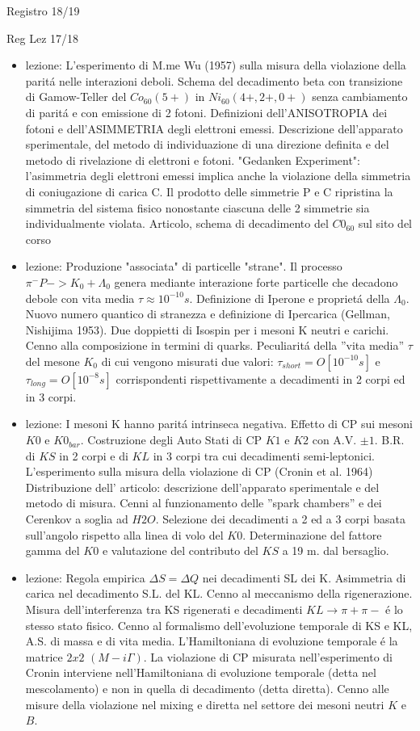 \begin{frame}{Registro 18/19}
\begin{frame}[allowframebreaks]{Reg Lez 17/18}
\begin{itemize}
\item lezione: L'esperimento di M.me Wu (1957) sulla misura della violazione della parit\'a nelle interazioni deboli. Schema del decadimento beta con transizione di Gamow-Teller del $Co_{60}(5+)$ in $Ni_{60}(4+,2+,0+)$ senza cambiamento di parit\'a e con emissione di 2 fotoni. Definizioni dell'ANISOTROPIA dei fotoni e dell'ASIMMETRIA degli elettroni emessi. Descrizione dell'apparato sperimentale, del metodo di individuazione di una direzione definita e del metodo di rivelazione di elettroni e fotoni. "Gedanken Experiment": l'asimmetria degli elettroni emessi implica anche la violazione della simmetria di coniugazione di carica C. Il prodotto delle simmetrie P e C ripristina la simmetria del sistema fisico nonostante ciascuna delle 2 simmetrie sia individualmente violata. Articolo, schema di decadimento del $C0_{60}$ sul sito del corso

\item lezione: Produzione "associata" di particelle "strane". Il processo $\pi^- P ->K_0 + \Lambda_0$ genera mediante interazione forte particelle che decadono debole con vita media $\tau\approx 10^{-10} s$. Definizione di Iperone e propriet\'a della $\Lambda_0$. Nuovo numero quantico di stranezza e definizione di Ipercarica (Gellman, Nishijima 1953). Due doppietti di Isospin per i mesoni K neutri e carichi. Cenno alla composizione in termini di quarks. Peculiarit\'a della ''vita media'' $\tau$ del mesone $K_0$ di cui vengono misurati due valori: $\tau_{short}=O[10^{-10}s]$ e $\tau_{long}=O[10^{-8}s]$ corrispondenti rispettivamente a decadimenti in 2 corpi ed in 3 corpi. 

\item lezione: I mesoni K hanno parit\'a intrinseca negativa. Effetto di CP sui mesoni $K0$ e $K0_{bar}$. Costruzione degli Auto Stati di CP $K1$ e $K2$ con A.V. $\pm1$. B.R. di $KS$ in 2 corpi e di $KL$ in 3 corpi tra cui decadimenti semi-leptonici. L'esperimento sulla misura della violazione di CP (Cronin et al. 1964) Distribuzione dell' articolo: descrizione dell'apparato sperimentale e del metodo di misura. Cenni al funzionamento delle ''spark chambers'' e dei Cerenkov a soglia ad $H2O$. Selezione dei decadimenti a 2 ed a 3 corpi basata sull'angolo rispetto alla linea di volo del $K0$. Determinazione del fattore gamma del $K0$ e valutazione del contributo del $KS$ a 19 m. dal bersaglio.

\item lezione: Regola empirica $\Delta S=\Delta Q$ nei decadimenti SL dei K. Asimmetria di carica nel decadimento S.L. del KL. Cenno al meccanismo della rigenerazione. Misura dell'interferenza tra KS rigenerati e decadimenti $KL\to\pi+\pi-$ \'e lo stesso stato fisico. Cenno al formalismo dell'evoluzione temporale di KS e KL, A.S. di massa e di vita media. L'Hamiltoniana di evoluzione temporale \'e la matrice $2x2$ $(M-i\Gamma)$. La violazione di CP misurata nell'esperimento di Cronin interviene nell'Hamiltoniana di evoluzione temporale (detta nel mescolamento) e non in quella di decadimento (detta diretta). Cenno alle misure della violazione nel mixing e diretta nel settore dei mesoni neutri $K$ e $B$. 


\end{itemize}
\end{frame}
\end{frame}
